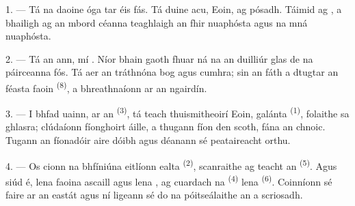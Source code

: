 %

\VUsaut{4.0mm}
\VUsaut{1.6mm}
\VUsaut{3.2mm}

\VUsaut{1.6mm}
\VUsaut{2.6mm}

\VUsaut{3.0mm}

1. --- Tá na daoine óga tar éis fás. Tá duine acu, Eoin, ag pósadh. Táimid ag
, a bhailigh ag an mbord céanna teaghlaigh an fhir
nuaphósta agus na mná nuaphósta.

2. --- Tá an  ann, mí . Níor bhain gaoth
fhuar  ná na  an duilliúr glas de na
páirceanna fós. Tá aer an tráthnóna bog agus cumhra; sin an fáth a dtugtar an
féasta faoin  \textsuperscript{(8)}, a bhreathnaíonn ar an
ngairdín.

3. --- I bhfad uainn, ar an  \textsuperscript{(3)}, tá teach
thuismitheoirí Eoin,  galánta \textsuperscript{(1)}, folaithe sa
ghlasra; clúdaíonn fíonghoirt áille, a thugann fíon den scoth, fána an chnoic. Tugann
an fíonadóir aire dóibh agus déanann sé peataireacht orthu.

4. --- Os cionn na bhfíniúna eitlíonn ealta 
\textsuperscript{(2)}, scanraithe ag teacht an 
\textsuperscript{(5)}. Agus siúd é, lena  faoina ascaill agus lena
, ag cuardach na 
\textsuperscript{(4)} lena  \textsuperscript{(6)}. Coinníonn sé
faire ar an eastát agus ní ligeann sé do na póitseálaithe an  a
scriosadh.

